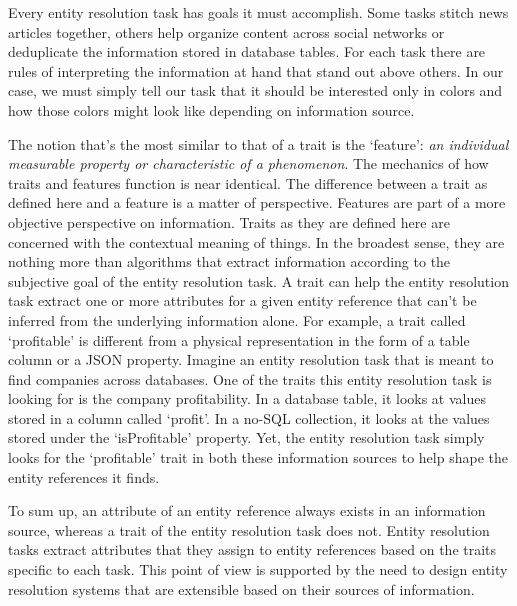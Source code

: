 \documentclass[11pt]{article}
\begin{document}
    Every entity resolution task has goals it must accomplish.
    Some tasks stitch news articles together, others help organize content
    across social networks or deduplicate the information stored in database
    tables.
    For each task there are rules of interpreting the information at hand that
    stand out above others.
    In our case, we must simply tell our task that it should be interested only
    in colors and how those colors might look like depending on information
    source.
    
    The notion that's the most similar to that of a trait is the `feature':
    \textit{an individual measurable property or characteristic of a
    phenomenon}\cite{bishop2006pattern}.
    The mechanics of how traits and features function is near identical.
    The difference between a trait as defined here and a feature is a matter of
    perspective.
    Features are part of a more objective perspective on information.
    Traits as they are defined here are concerned with the contextual meaning of
    things.
    In the broadest sense, they are nothing more than algorithms that extract
    information according to the subjective goal of the entity resolution task.
    A trait can help the entity resolution task extract one or more attributes
    for a given entity reference that can't be inferred from the underlying
    information alone.
    For example, a trait called `profitable' is different from a physical
    representation in the form of a table column or a JSON property.
    Imagine an entity resolution task that is meant to find companies across
    databases.
    One of the traits this entity resolution task is looking for is the company
    profitability.
    In a database table, it looks at values stored in a column called `profit'.
    In a no-SQL collection, it looks at the values stored under the
    `isProfitable' property.
    Yet, the entity resolution task simply looks for the `profitable' trait in
    both these information sources to help shape the entity references it finds.

    To sum up, an attribute of an entity reference always exists in an
    information source, whereas a trait of the entity resolution task does not.
    Entity resolution tasks extract attributes that they assign to entity
    references based on the traits specific to each task.
    This point of view is supported by the need to design entity resolution
    systems that are extensible based on their sources of
    information\cite{fever2009}\cite{magellan2020}\cite{oyster2012}.
\end{document}
